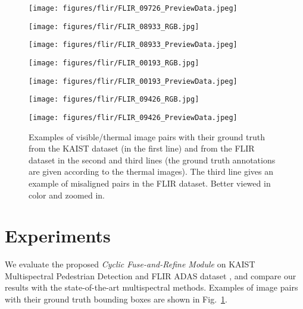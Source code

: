\documentclass{article}
\begin{document}
\begin{figure}[]
\begin{minipage}[b]{.241\linewidth}
  \centering
  \centerline{\texttt{[image: figures/flir/FLIR\_09726\_PreviewData.jpeg]}}
\end{minipage}
\begin{minipage}[b]{.241\linewidth}
  \centering
  \centerline{\texttt{[image: figures/flir/FLIR\_08933\_RGB.jpg]}}
\end{minipage}
\begin{minipage}[b]{.241\linewidth}
  \centering
  \centerline{\texttt{[image: figures/flir/FLIR\_08933\_PreviewData.jpeg]}}
\end{minipage}
\begin{minipage}[b]{.241\linewidth}
  \centering
  \centerline{\texttt{[image: figures/flir/FLIR\_00193\_RGB.jpg]}}
\end{minipage}
\begin{minipage}[b]{.241\linewidth}
  \centering
  \centerline{\texttt{[image: figures/flir/FLIR\_00193\_PreviewData.jpeg]}}
\end{minipage}
\begin{minipage}[b]{.241\linewidth}
  \centering
  \centerline{\texttt{[image: figures/flir/FLIR\_09426\_RGB.jpg]}}
\end{minipage}
\begin{minipage}[b]{.241\linewidth}
  \centering
  \centerline{\texttt{[image: figures/flir/FLIR\_09426\_PreviewData.jpeg]}}
\end{minipage}
\caption{Examples of visible/thermal image pairs with their ground truth from the KAIST dataset (in the first line) and from the FLIR dataset in the second and third lines (the ground truth annotations are given according to the thermal images). The third line gives an example of misaligned pairs in the FLIR dataset. 
Better viewed in color and zoomed in.}
\label{fig:example}
\end{figure}

\section{Experiments}
\label{sec:expe}

We evaluate the proposed \textit{Cyclic Fuse-and-Refine Module} on KAIST Multispectral Pedestrian Detection \cite{KAIST} and FLIR ADAS dataset \cite{Flir},
and compare our results with the state-of-the-art multispectral methods. Examples of  image pairs with their ground truth bounding boxes are shown in Fig.~\ref{fig:example}.
\end{document}
